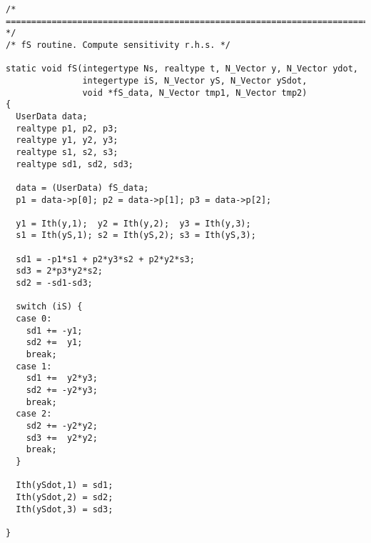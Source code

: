 \begin{verbatim}
/* ======================================================================= */
/* fS routine. Compute sensitivity r.h.s. */

static void fS(integertype Ns, realtype t, N_Vector y, N_Vector ydot, 
               integertype iS, N_Vector yS, N_Vector ySdot, 
               void *fS_data, N_Vector tmp1, N_Vector tmp2)
{
  UserData data;
  realtype p1, p2, p3;
  realtype y1, y2, y3;
  realtype s1, s2, s3;
  realtype sd1, sd2, sd3;

  data = (UserData) fS_data;
  p1 = data->p[0]; p2 = data->p[1]; p3 = data->p[2];

  y1 = Ith(y,1);  y2 = Ith(y,2);  y3 = Ith(y,3);
  s1 = Ith(yS,1); s2 = Ith(yS,2); s3 = Ith(yS,3);

  sd1 = -p1*s1 + p2*y3*s2 + p2*y2*s3;
  sd3 = 2*p3*y2*s2;
  sd2 = -sd1-sd3;

  switch (iS) {
  case 0:
    sd1 += -y1;
    sd2 +=  y1;
    break;
  case 1:
    sd1 +=  y2*y3;
    sd2 += -y2*y3;
    break;
  case 2:
    sd2 += -y2*y2;
    sd3 +=  y2*y2;
    break;
  }
  
  Ith(ySdot,1) = sd1;
  Ith(ySdot,2) = sd2;
  Ith(ySdot,3) = sd3;

}
\end{verbatim}
